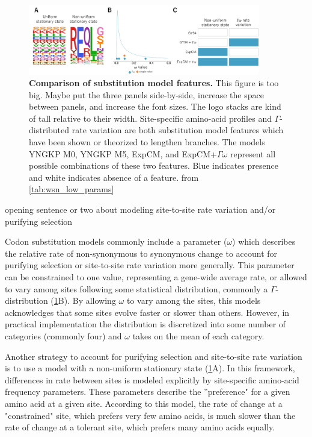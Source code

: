 \documentclass[11pt]{article}
\newcommand\skhcomment[1]{{\color{cyan}#1}}
\newcommand\jdbcomment[1]{{\color{red}#1}}
\begin{document}
\begin{figure}[H]
\centerline{\includegraphics[width=0.90\textwidth]{figures/model_feature.pdf}}
\caption{\label{fig:model_feature}
\textbf{Comparison of substitution model features.}
\jdbcomment{This figure is too big. Maybe put the three panels side-by-side, increase the space between panels, and increase the font sizes. The logo stacks are kind of tall relative to their width.}
Site-specific amino-acid profiles and $\Gamma$-distributed rate variation are both substitution model features which have been shown or theorized to lengthen branches. 
The models YNGKP M0, YNGKP M5, ExpCM, and ExpCM+$\Gamma\omega$ represent all possible combinations of these two features. 
Blue indicates presence and white indicates absence of a feature. 
from \ref{tab:wsn_low_params}
}
\end{figure}

\skhcomment{opening sentence or two about modeling site-to-site rate variation and/or purifying selection}

Codon substitution models commonly include a parameter ($\omega$) which describes the relative rate of non-synonymous to synonymous change to account for purifying selection or site-to-site rate variation more generally. 
This parameter can be constrained to one value, representing a gene-wide average rate, or allowed to vary among sites following some statistical distribution, commonly a $\Gamma$-distribution (\ref{fig:model_feature}B). 
By allowing $\omega$ to vary among the sites, this models acknowledges that some sites evolve faster or slower than others. 
However, in practical implementation the distribution is discretized into some number of categories (commonly four) and $\omega$ takes on the mean of each category. 

Another strategy to account for purifying selection and site-to-site rate variation is to use a model with a non-uniform stationary state (\ref{fig:model_feature}A). 
In this framework, differences in rate between sites is modeled explicitly by site-specific amino-acid frequency parameters. 
These parameters describe the ''preference" for a given amino acid at a given site. 
According to this model, the rate of change at a "constrained" site, which prefers very few amino acids, is much slower than the rate of change at a tolerant site, which prefers many amino acids equally. 
\end{document}
